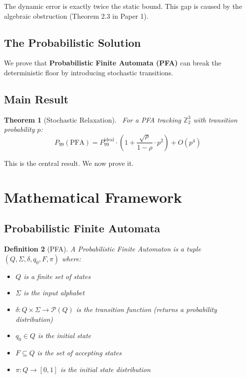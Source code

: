 \documentclass[11pt]{article}
\newtheorem{theorem}{Theorem}[section]
\newtheorem{definition}[theorem]{Definition}
\begin{document}
The dynamic error is exactly twice the static bound. This gap is caused by the algebraic obstruction (Theorem 2.3 in Paper 1).

\subsection{The Probabilistic Solution}

We prove that \textbf{Probabilistic Finite Automata (PFA)} can break the deterministic floor by introducing stochastic transitions.

\subsection{Main Result}

\begin{theorem}[Stochastic Relaxation]~\label{thm:main}
For a PFA tracking $\mathbb{Z}_2^3$ with transition probability $p$:
$$P_{99}(\text{PFA}) = P_{99}^{\text{ideal}} \cdot \left(1 + \frac{\sqrt{\rho}}{1-\rho} \cdot p^2\right) + O(p^4)$$
\end{theorem}

This is the central result. We now prove it.

\section{Mathematical Framework}

\subsection{Probabilistic Finite Automata}

\begin{definition}[PFA]
A Probabilistic Finite Automaton is a tuple $(Q, \Sigma, \delta, q_0, F, \pi)$ where:
\begin{itemize}
    \item $Q$ is a finite set of states
    \item $\Sigma$ is the input alphabet
    \item $\delta: Q \times \Sigma \to \mathcal{P}(Q)$ is the transition function (returns a probability distribution)
    \item $q_0 \in Q$ is the initial state
    \item $F \subseteq Q$ is the set of accepting states
    \item $\pi: Q \to [0, 1]$ is the initial state distribution
\end{itemize}
\end{definition}
\end{document}
